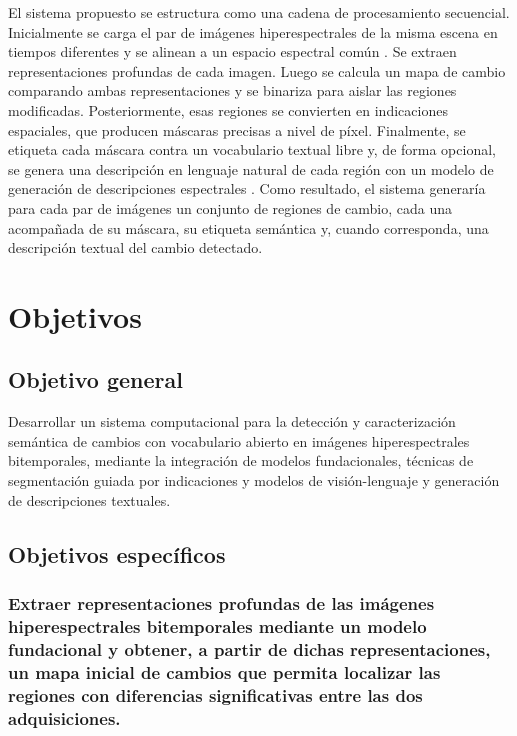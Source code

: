 \documentclass[12pt,onecolumn]{IEEEtran}
\renewcommand{\thesection}{\arabic{section}}
\renewcommand{\thesubsection}{\thesection.\arabic{subsection}}
\renewcommand{\thesubsubsection}{\thesubsection.\arabic{subsubsection}}
\begin{document}
El sistema propuesto se estructura como una cadena de procesamiento secuencial. Inicialmente se carga el par de imágenes hiperespectrales de la misma escena en tiempos diferentes y se alinean a un espacio espectral común \cite{wang2024hypersigma}. Se extraen representaciones profundas de cada imagen. Luego se calcula un mapa de cambio comparando ambas representaciones y se binariza para aislar las regiones modificadas. Posteriormente, esas regiones se convierten en indicaciones espaciales, que producen máscaras precisas a nivel de píxel. Finalmente, se etiqueta cada máscara contra un vocabulario textual libre y, de forma opcional, se genera una descripción en lenguaje natural de cada región con un modelo de generación de descripciones espectrales \cite{li2022blip, das2025hypercap}. Como resultado, el sistema generaría para cada par de imágenes un conjunto de regiones de cambio, cada una acompañada de su máscara, su etiqueta semántica y, cuando corresponda, una descripción textual del cambio detectado.



\newpage
\section{\textbf{Objetivos}}

    \subsection{Objetivo general}
    Desarrollar un sistema computacional para la detección y caracterización semántica de cambios con vocabulario abierto en imágenes hiperespectrales bitemporales, mediante la integración de modelos fundacionales, técnicas de segmentación guiada por indicaciones y modelos de visión-lenguaje y generación de descripciones textuales.

    \subsection{Objetivos específicos}
    \renewcommand{\thesubsubsection}{\thesubsection.\arabic{subsubsection}}

    \subsubsection{\normalfont Extraer representaciones profundas de las imágenes hiperespectrales bitemporales mediante un modelo fundacional y obtener, a partir de dichas representaciones, un mapa inicial de cambios que permita localizar las regiones con diferencias significativas entre las dos adquisiciones.}
\end{document}
